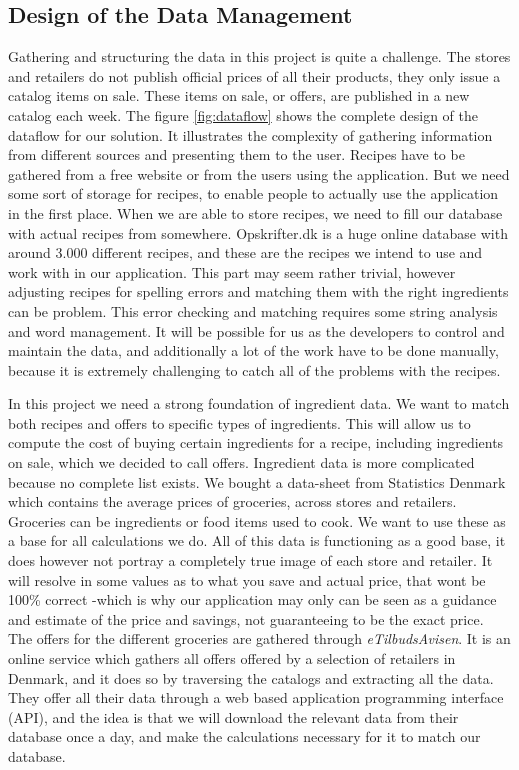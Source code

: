 \subsection{Design of the Data Management}\label{subsec:datamanagement}

Gathering and structuring the data in this project is quite a challenge. The stores and retailers do not publish official prices of all their products, they only issue a catalog items on sale. These items on sale, or offers, are published in a new catalog each week. The figure \ref{fig:dataflow} shows the complete design of the dataflow for our solution. It illustrates the complexity of gathering information from different sources and presenting them to the user. Recipes have to be gathered from a free website or from the users using the application. But we need some sort of storage for recipes, to enable people to actually use the application in the first place. When we are able to store recipes, we need to fill our database with actual recipes from somewhere. Opskrifter.dk is a huge online database with around 3.000 different recipes, and these are the recipes we intend to use and work with in our application. This part may seem rather trivial, however adjusting recipes for spelling errors and matching them with the right ingredients can be problem. This error checking and matching requires some string analysis and word management. It will be possible for us as the developers to control and maintain the data, and additionally a lot of the work have to be done manually, because it is extremely challenging to catch all of the problems with the recipes.

In this project we need a strong foundation of ingredient data. We want to match both recipes and offers to specific types of ingredients. This will allow us to compute the cost of buying certain ingredients for a recipe, including ingredients on sale, which we decided to call offers. Ingredient data is more complicated because no complete list exists. We bought a data-sheet from Statistics Denmark which contains the average prices of groceries, across stores and retailers. Groceries can be ingredients or food items used to cook. We want to use these as a base for all calculations we do. All of this data is functioning as a good base, it does however not portray a completely true image of each store and retailer. It will resolve in some values as to what you save and actual price, that wont be 100\% correct -which is why our application may only can be seen as a guidance and estimate of the price and savings, not guaranteeing to be the exact price. The offers for the different groceries are gathered through \textit{eTilbudsAvisen}. It is an online service which gathers all offers offered by a selection of retailers in Denmark, and it does so by traversing the catalogs and extracting all the data. They offer all their data through a web based application programming interface (API), and the idea is that we will download the relevant data from their database once a day, and make the calculations necessary for it to match our database. 

